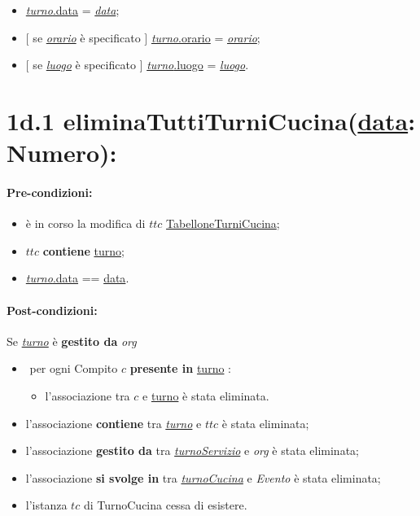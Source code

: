  \begin{itemize}
     \item \underline{\textit{turno}.data} = \underline{\textit{data}};

    \item $[$ se \underline{\textit{orario}} è specificato $]$ \underline{\textit{turno}.orario} = \underline{\textit{orario}};

    \item $[$ se \underline{\textit{luogo}} è specificato $]$ \underline{\textit{turno}.luogo} = \underline{\textit{luogo}}.

\end{itemize}

\section*{1d.1 eliminaTuttiTurniCucina(\underline{data}: Numero):}

\paragraph{Pre-condizioni:}
\begin{itemize}
 \item è in corso la modifica di $ttc$ \underline{TabelloneTurniCucina};
 \item $ttc$ \textbf{contiene} \underline{turno};
 \item \underline{\textit{turno}.data} == \underline{data}.
\end{itemize}

\paragraph{Post-condizioni:} Se \underline{\textit{turno}} è \textbf{gestito da} {\textit{org}}

\begin{itemize}
   \item \textlangle $ $ per ogni Compito $c$ \textbf{presente in} \underline{turno} \textrangle:
    \begin{itemize}
        \item l'associazione tra $c$ e \underline{turno} è stata eliminata.
    \end{itemize}
    \item l'associazione \textbf{contiene} tra \underline{\textit{turno}} e $ttc$ è stata eliminata;
    \item l'associazione \textbf{gestito da} tra \underline{\textit{turnoServizio}} e \textit{org} è stata eliminata;
\item l'associazione \textbf{si svolge in} tra \underline{\textit{turnoCucina}} e \textit{Evento} è stata eliminata;
    \item l'istanza $tc$ di TurnoCucina cessa di esistere.
\end{itemize}


